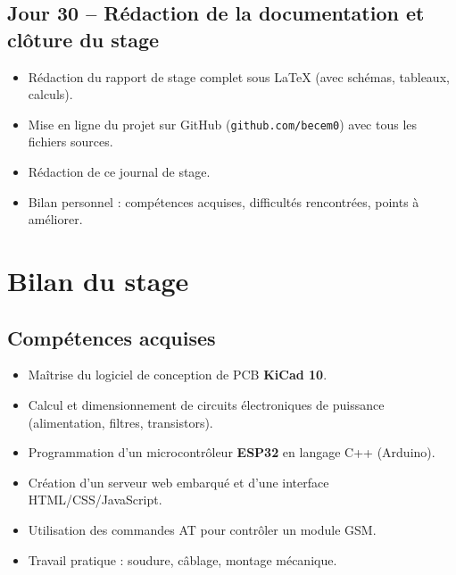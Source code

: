 \documentclass[12pt,a4paper]{article}
\begin{document}
\subsection*{Jour 30 -- Rédaction de la documentation et clôture du stage}
\begin{itemize}
    \item Rédaction du rapport de stage complet sous \LaTeX{} (avec schémas, tableaux, calculs).
    \item Mise en ligne du projet sur GitHub (\texttt{github.com/becem0}) avec tous les fichiers sources.
    \item Rédaction de ce journal de stage.
    \item Bilan personnel : compétences acquises, difficultés rencontrées, points à améliorer.
\end{itemize}

\newpage

\section*{Bilan du stage}

\subsection*{Compétences acquises}
\begin{itemize}
    \item Maîtrise du logiciel de conception de PCB \textbf{KiCad 10}.
    \item Calcul et dimensionnement de circuits électroniques de puissance (alimentation, filtres, transistors).
    \item Programmation d'un microcontrôleur \textbf{ESP32} en langage C++ (Arduino).
    \item Création d'un serveur web embarqué et d'une interface HTML/CSS/JavaScript.
    \item Utilisation des commandes AT pour contrôler un module GSM.
    \item Travail pratique : soudure, câblage, montage mécanique.
\end{itemize}
\end{document}

